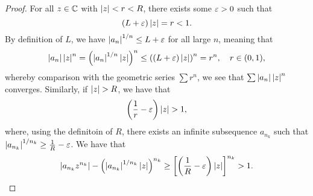 \begin{proof}
    For all $z \in \mathbb C$ with $\left\lvert z \right\rvert < r < R$, there exists some $\varepsilon > 0$ such that
    \[ (L + \varepsilon)\left\lvert z \right\rvert = r < 1. \]
    By definition of $L$, we have $\left\lvert a_n \right\rvert^{1/n} \leq L + \varepsilon$ for all large $n$, meaning that
    \[ \left\lvert a_n \right\rvert \left\lvert z \right\rvert^n = \left(\left\lvert a_n \right\rvert^{1/n} \left\lvert z \right\rvert\right)^n \leq \left((L + \varepsilon) \left\lvert z \right\rvert\right)^n = r^n, \quad r \in (0, 1), \]
    whereby comparison with the geometric series $\sum r^n$, we see that $\sum \left\lvert a_n \right\rvert \left\lvert z \right\rvert^n$ converges. Similarly, if $\left\lvert z \right\rvert > R$, we have that
    \[ \left(\frac{1}{r} - \varepsilon\right) \left\lvert z \right\rvert > 1, \]
    where, using the definitoin of $R$, there exists an infinite subsequence $a_{n_k}$ such that $\left\lvert a_{n_k} \right\rvert^{1/n_k} \geq \frac{1}{R} - \varepsilon$. We have that
    \[ \left\lvert a_{n_k} z^{n_k} \right\rvert - \left(\left\lvert a_{n_k} \right\rvert^{1/n_k} \left\lvert z \right\rvert\right)^{n_k} \geq \left[ \left(\frac{1}{R} - \varepsilon\right) \left\lvert z \right\rvert\right]^{n_k} > 1. \qedhere \]
\end{proof}